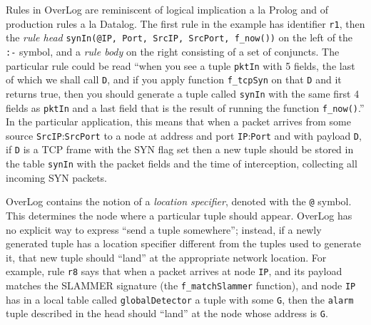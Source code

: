 \documentclass[10pt,twocolumn]{MyTightStyle}
\newcommand{\ol}[1]{{\tt\footnotesize#1}}
\begin{document}
Rules in OverLog are reminiscent of logical implication a la Prolog and
of production rules a la Datalog. The first rule in the example has
identifier \ol{r1}, then the \emph{rule head}  \ol{synIn(@IP, Port, SrcIP, SrcPort,
f\_now())} on the left of the \ol{:-} symbol, and a \emph{rule body} on
the right consisting of a set of conjuncts. The particular rule could be
read  ``when you see a tuple
\ol{pktIn} with 5 fields, the last of which we shall call \ol{D}, and if
you apply function \ol{f\_tcpSyn} on that \ol{D} and it returns true,
then you should generate a tuple called \ol{synIn} with the same first 4
fields as \ol{pktIn} and a last field that is the result of running the
function \ol{f\_now()}.'' In the particular application, this means that
when a packet arrives from some source \ol{SrcIP}:\ol{SrcPort} to a node
at address and port \ol{IP}:\ol{Port} and with payload \ol{D}, if \ol{D}
is a TCP frame with the SYN flag set then a new tuple should be stored
in the table \ol{synIn} with the packet fields and the time of
interception, collecting all incoming SYN packets.

OverLog contains the notion of a \emph{location specifier}, denoted with
the \ol{@} symbol. This determines the node where a particular tuple
should appear. OverLog has no explicit way to express ``send a tuple
somewhere''; instead, if a newly generated tuple has a location
specifier different from the tuples used to generate it, that new
tuple should ``land'' at the appropriate network location.  For example,
rule \ol{r8} says that when a packet arrives at node \ol{IP}, and its
payload matches the SLAMMER signature (the \ol{f\_matchSlammer}
function), and node \ol{IP} has in a local table called
\ol{globalDetector} a tuple with some \ol{G}, then the
\ol{alarm} tuple described in the head should ``land'' at the node whose
address is \ol{G}.
\end{document}
